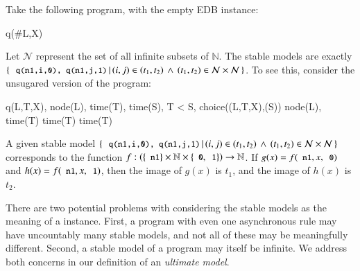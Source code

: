 \begin{example}
\label{ex:uncountable}
Take the following \lang program, with the empty EDB instance:

\begin{Drules}
        {q(#L,X)}
\end{Drules}

Let $\mathcal{N}$ represent the set of all infinite subsets of $\mathbb{N}$.
The stable models are exactly $\{ \, \dedalus{q(n1,i,0), q(n1,j,1)} \, | \, (i,j) \in (t_1, t_2) \, \land \, (t_1, t_2) \in \mathcal{N}
\times \mathcal{N} \, \}$.  To see this, consider the unsugared version of the program:

\begin{Drules}
        {q(L,T,X), node(L), time(T), time(S), T < S, choice((L,T,X),(S))}
        {node(L), time(T)}
        {time(T)}
        {time(T)}
\end{Drules}



A given stable model $\{ \, \dedalus{q(n1,i,0), q(n1,j,1)} \, | \, (i,j)\in (t_1, t_2) \, \land \, (t_1, t_2)\in \mathcal{N}                                                    
\times \mathcal{N} \, \}$ corresponds to the function $f : \left(\{\dedalus{n1}\} \times \mathbb{N} \times \{\dedalus{0},\dedalus{1}\}\right) \rightarrow \mathbb{N}$.  If $g(x) = f(\dedalus{n1}, x, \dedalus{0})$ and $h(x) = f(\dedalus{n1}, x, \dedalus{1})$, then the image of $g(x)$ is $t_1$, and the image of $h(x)$ is $t_2$.
\end{example}


There are two potential problems with considering the stable models as the meaning of a \lang instance.  
First, a program with even one asynchronous rule may have uncountably many stable models, and not all of these may be meaningfully different.  Second, a stable model of a \lang program may itself be infinite.  We address both concerns in our definition of an {\em ultimate model}.

